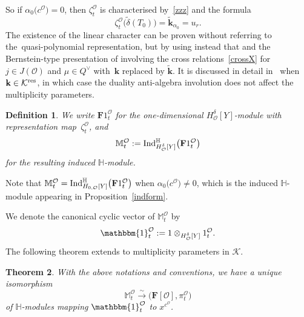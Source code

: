 \documentclass[pdftex]{sigma}
\numberwithin{equation}{section}
\newtheorem{Theorem}{Theorem}[section]
\newtheorem{Definition}[Theorem]{Definition}
\begin{document}
So if $\alpha_0\bigl(c^\mathcal{O}\bigr)=0$, then $\zeta_t^\mathcal{O}$ is characterised by~\eqref{zzz} and the formula
\[
\zeta_{t}^\mathcal{O}\bigl(\widetilde{\delta}(T_0)\bigr)=\widetilde{\mathbf{k}}_{\alpha_0}=u_r.
\]
The existence of the linear character  can be proven without referring to the~quasi-polynomial representation, but by using instead that  and the Bernstein-type presentation of  involving the cross relations~\eqref{crossX} for $j\in J(\mathcal{O})$ and $\mu\in Q^\vee$ with~$\mathbf{k}$ replaced by $\widetilde{\mathbf{k}}$.
 It is discussed in detail in~\cite[Section~3.2]{SSV2} when $\mathbf{k}\in\mathcal{K}^{{\rm res}}$, in which case the duality anti-algebra involution does not affect the multiplicity parameters.

\begin{Definition}
We write $\mathbf{F}1_{t}^\mathcal{O}$ for the one-dimensional $H_\mathcal{O}^\delta[Y]$-module with
representation map~$\zeta_{t}^\mathcal{O}$, and
\[
\mathbb{M}_{t}^\mathcal{O}:={\rm Ind}_{H_\mathcal{O}^\delta[Y]}^{\mathbb{H}}\bigl(\mathbf{F}1_{t}^\mathcal{O}\bigr)
\]
for the resulting induced $\mathbb{H}$-module.
\end{Definition}
Note that $\mathbb{M}_t^\mathcal{O}={\rm Ind}_{H_{0,\mathcal{O}}[Y]}^{\mathbb{H}}\bigl(\mathbf{F}1_t^\mathcal{O}\bigr)$ when $\alpha_0\bigl(c^\mathcal{O}\bigr)\not=0$, which is the induced $\mathbb{H}$-module appearing in Proposition~\ref{indform}.

We denote the canonical cyclic vector of $\mathbb{M}_t^\mathcal{O}$ by
\[
\mathbbm{1}_{t}^\mathcal{O}:=1\otimes_{H_\mathcal{O}^\delta[Y]}1_{t}^\mathcal{O}.
\]
The following theorem extends \cite[Theorem~4.5\,(2)]{SSV2} to multiplicity parameters in $\mathcal{K}$.

\begin{Theorem}
With the above notations and conventions, we have a unique isomorphism
\[
\mathbb{M}_{t}^\mathcal{O}\overset{\sim}{\longrightarrow} \bigl(\mathbf{F}[\mathcal{O}],\pi_{t}^\mathcal{O}\bigr)
\]
of $\mathbb{H}$-modules mapping
$\mathbbm{1}_{t}^\mathcal{O}$ to $x^{c^\mathcal{O}}$.
\end{Theorem}
\end{document}
